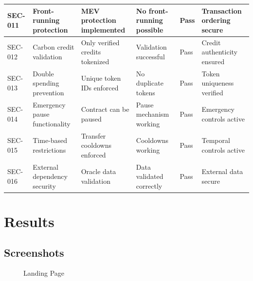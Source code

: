 \documentclass[oneside,a4paper,12pt]{book}
\begin{document}
\begin{longtable}{|p{1.5cm}|p{3.5cm}|p{2.8cm}|p{2.5cm}|p{1.8cm}|p{2.3cm}|}
SEC-011 & Front-running protection & MEV protection implemented & No front-running possible & Pass & Transaction ordering secure \\
\hline

SEC-012 & Carbon credit validation & Only verified credits tokenized & Validation successful & Pass & Credit authenticity ensured \\
\hline

SEC-013 & Double spending prevention & Unique token IDs enforced & No duplicate tokens & Pass & Token uniqueness verified \\
\hline

SEC-014 & Emergency pause functionality & Contract can be paused & Pause mechanism working & Pass & Emergency controls active \\
\hline

SEC-015 & Time-based restrictions & Transfer cooldowns enforced & Cooldowns working & Pass & Temporal controls active \\
\hline

SEC-016 & External dependency security & Oracle data validation & Data validated correctly & Pass & External data secure \\
\hline

\end{longtable}

\chapter{Results}
\newpage
\section{Screenshots}

\begin{center}
    \begin{figure}[!htbp]
        \centering
        \caption{Landing Page}
    \end{figure}
\end{center}
\end{document}
